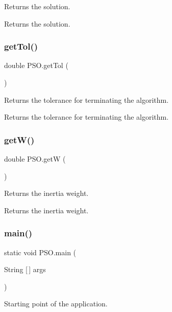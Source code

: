 Returns the solution. \begin{DoxyReturn}{Returns}
the solution. 
\end{DoxyReturn}
\mbox{\label{class_p_s_o_a57be39727a5a7e22182c82d4274ba3ae}} 
\subsubsection{\texorpdfstring{get\+Tol()}{getTol()}}
{\footnotesize\ttfamily double P\+S\+O.\+get\+Tol (\begin{DoxyParamCaption}{ }\end{DoxyParamCaption})}

Returns the tolerance for terminating the algorithm. \begin{DoxyReturn}{Returns}
the tolerance for terminating the algorithm. 
\end{DoxyReturn}
\mbox{\label{class_p_s_o_a50f5f8be53be944150317d590c411144}} 
\subsubsection{\texorpdfstring{get\+W()}{getW()}}
{\footnotesize\ttfamily double P\+S\+O.\+getW (\begin{DoxyParamCaption}{ }\end{DoxyParamCaption})}

Returns the inertia weight. \begin{DoxyReturn}{Returns}
the inertia weight. 
\end{DoxyReturn}
\mbox{\label{class_p_s_o_a966198c3d9ecb21acf593a5e922ba843}} 
\subsubsection{\texorpdfstring{main()}{main()}}
{\footnotesize\ttfamily static void P\+S\+O.\+main (\begin{DoxyParamCaption}\item[{String \mbox{[}$\,$\mbox{]}}]{args }\end{DoxyParamCaption})\hspace{0.3cm}{\ttfamily [static]}}

Starting point of the application. \mbox{\label{class_p_s_o_a83a2cd74d2176ea147b84e17050ceffb}} 
